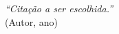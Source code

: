 
\vspace*{\fill}
\begin{flushright}
\textit{``Citação a ser escolhida.''}\\
(Autor, ano)
\end{flushright}
